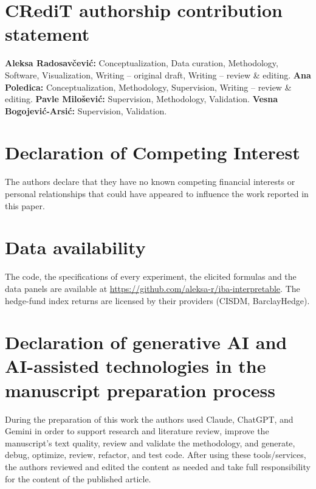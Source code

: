\section*{CRediT authorship contribution statement}
\textbf{Aleksa Radosav\v{c}evi\'c:} Conceptualization, Data curation, Methodology, Software, Visualization, Writing -- original draft, Writing -- review \& editing.
\textbf{Ana Poledica:} Conceptualization, Methodology, Supervision, Writing -- review \& editing.
\textbf{Pavle Milo\v{s}evi\'c:} Supervision, Methodology, Validation.
\textbf{Vesna Bogojevi\'c-Arsi\'c:} Supervision, Validation.

\section*{Declaration of Competing Interest}
The authors declare that they have no known competing financial interests or personal relationships that could have appeared to influence the work reported in this paper.

\section*{Data availability}
The code, the specifications of every experiment, the elicited formulas and the data panels are available at \url{https://github.com/aleksa-r/iba-interpretable}. The hedge-fund index returns are licensed by their providers (CISDM, BarclayHedge).

\section*{Declaration of generative AI and AI-assisted technologies in the manuscript preparation process}
During the preparation of this work the authors used Claude, ChatGPT, and Gemini in order to support research and literature review, improve the manuscript's text quality, review and validate the methodology, and generate, debug, optimize, review, refactor, and test code. After using these tools/services, the authors reviewed and edited the content as needed and take full responsibility for the content of the published article.

